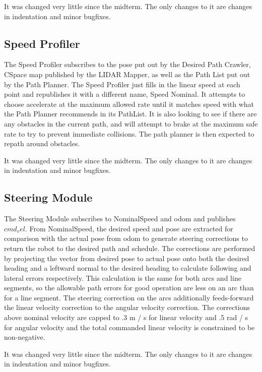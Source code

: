\documentclass{article}
\begin{document}
It was changed very little since the midterm. The only changes to it are changes in indentation and minor bugfixes.


\subsection{Speed Profiler}

The Speed Profiler subscribes to the pose put out by the Desired Path Crawler, CSpace map published by the LIDAR Mapper, as well as the Path List put out by the Path Planner.
The Speed Profiler just fills in the linear speed at each point and republishes it with a different name, Speed Nominal.
It attempts to choose accelerate at the maximum allowed rate until it matches speed with what the Path Planner recommends in its PathList.
It is also looking to see if there are any obstacles in the current path, and will attempt to brake at the maximum safe rate to try to prevent immediate collisions.
The path planner is then expected to repath around obstacles.

It was changed very little since the midterm. The only changes to it are changes in indentation and minor bugfixes.

\subsection{Steering Module}

The Steering Module subscribes to NominalSpeed and odom and publishes $cmd_vel$.
From NominalSpeed, the desired speed and pose are extracted for comparison with the actual pose from odom to generate steering corrections to return the robot to the desired path and schedule.
The corrections are performed by projecting the vector from desired pose to actual pose onto both the desired heading and a leftward normal to the desired heading to calculate following and lateral errors respectively.
This calculation is the same for both arcs and line segments, so the allowable path errors for good operation are less on an arc than for a line segment.
The steering correction on the arcs additionally feeds-forward the linear velocity correction to the angular velocity correction.
The corrections above nominal velocity are capped to .3 m / s for linear velocity and .5 rad / s for angular velocity and the total commanded linear velocity is constrained to be non-negative.

It was changed very little since the midterm. The only changes to it are changes in indentation and minor bugfixes.
\end{document}
